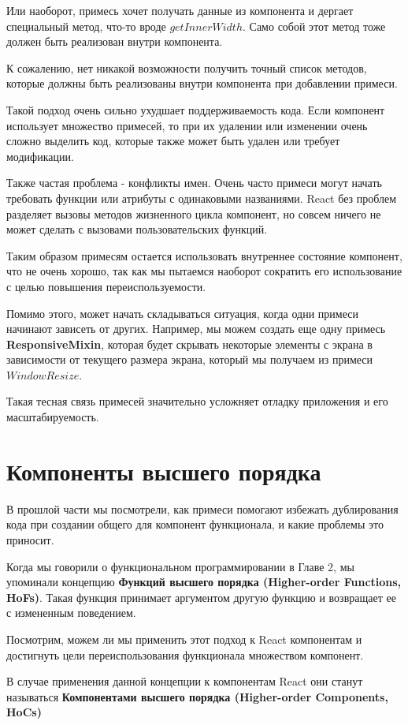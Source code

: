 Или наоборот, примесь хочет получать данные из компонента и дергает специальный метод, что-то вроде $getInnerWidth$. Само собой этот метод тоже должен быть реализован внутри компонента.

К сожалению, нет никакой возможности получить точный список методов, которые должны быть реализованы внутри компонента при добавлении примеси.

Такой подход очень сильно ухудшает поддерживаемость кода. Если компонент использует множество примесей, то при их удалении или изменении очень сложно выделить код, которые также может быть удален или требует модификации.

Также частая проблема - конфликты имен. Очень часто примеси могут начать требовать функции или атрибуты с одинаковыми названиями. React без проблем разделяет вызовы методов жизненного цикла компонент, но совсем ничего не может сделать с вызовами пользовательских функций.

Таким образом примесям остается использовать внутреннее состояние компонент, что не очень хорошо, так как мы пытаемся наоборот сократить его использование с целью повышения переиспользуемости.

Помимо этого, может начать складываться ситуация, когда одни примеси начинают зависеть от других. Например, мы можем создать еще одну примесь \textbf{ResponsiveMixin}, которая будет скрывать некоторые элементы с экрана в зависимости от текущего размера экрана, который мы получаем из примеси $WindowResize$.

Такая тесная связь примесей значительно усложняет отладку приложения и его масштабируемость. 

\section{Компоненты высшего порядка}

В прошлой части мы посмотрели, как примеси помогают избежать дублирования кода при создании общего для компонент функционала, и какие проблемы это приносит.

Когда мы говорили о функциональном программировании в Главе 2, мы упоминали концепцию \textbf{Функций высшего порядка (Higher-order Functions, HoFs)}. Такая функция принимает аргументом другую функцию и возвращает ее с измененным поведением.

Посмотрим, можем ли мы применить этот подход к React компонентам и достигнуть цели переиспользования функционала множеством компонент.

В случае применения данной концепции к компонентам React они станут называться \textbf{Компонентами высшего порядка (Higher-order Components, HoCs)}


